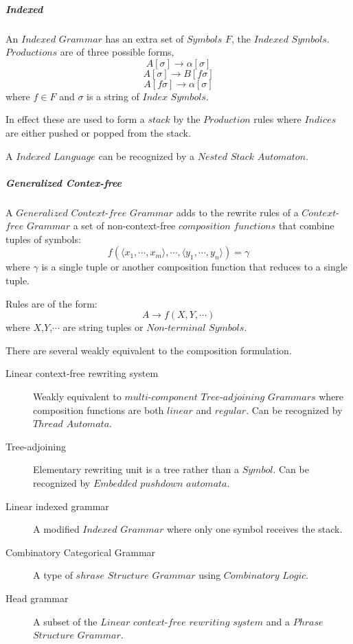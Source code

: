 \documentclass{article}
\begin{document}
    \subparagraph{Indexed}

    An $Indexed$ $Grammar$ has an extra set of $Symbols$ $F$, the
    $Indexed$ $Symbols$. $Productions$ are of three possible forms,
    \[
        A[\sigma] \rightarrow \alpha[\sigma]
    \]\[
        A[\sigma] \rightarrow B[f\sigma]
    \]\[
        A[f\sigma] \rightarrow \alpha[\sigma]
    \]
    where $f \in F$ and $\sigma$ is a string of $Index$ $Symbols$.

    In effect these are used to form a $stack$ by the $Production$
    rules where $Indices$ are either pushed or popped from the stack.

    A $Indexed$ $Language$ can be recognized by a $Nested$ $Stack$
    $Automaton$.

    \subparagraph{Generalized Contex-free}
    A $Generalized$ $Context$-$free$ $Grammar$ adds to the rewrite rules
    of a $Context$-$free$ $Grammar$ a set of non-context-free
    $composition$ $functions$ that combine tuples of symbols:
    \[
        f(\langle x_1,\cdots,x_m\rangle,\cdots,\langle
        y_1,\cdots,y_n\rangle)=\gamma
    \]
    where $\gamma$ is a single tuple or another composition function
    that reduces to a single tuple.

    Rules are of the form:
    \[
        A \rightarrow f(X,Y,\cdots)
    \]
    where $X$,$Y$,$\cdots$ are string tuples or $Non$-$terminal$ $Symbols$.

    There are several weakly equivalent to the composition formulation.

    \begin{description}
    \item[Linear context-free rewriting system]
    Weakly equivalent to $multi$-$component$ $Tree$-$adjoining$ $Grammars$
    where composition functions are both $linear$ and $regular$. Can
    be recognized by $Thread$ $Automata$.
    \item[Tree-adjoining]
    Elementary rewriting unit is a tree rather than a $Symbol$. Can be
    recognized by $Embedded$ $pushdown$ $automata$.
    \item[Linear indexed grammar]
    A modified $Indexed$ $Grammar$ where only one symbol receives the stack.
    \item[Combinatory Categorical Grammar]
    A type of $shrase$ $Structure$ $Grammar$ using $Combinatory$ $Logic$.
    \item[Head grammar]
    A subset of the $Linear$ $context$-$free$ $rewriting$ $system$ and a
    $Phrase$ $Structure$ $Grammar$.
    \end{description}
\end{document}
